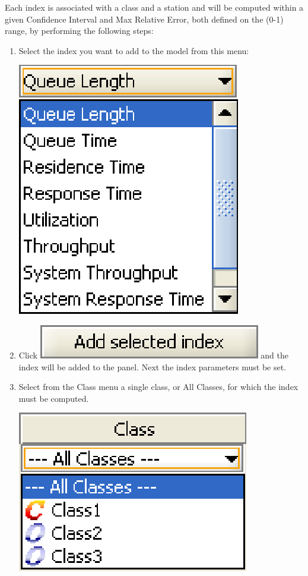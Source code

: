 Each index is associated with a class and a station and will be computed within a given Confidence Interval and Max Relative Error, both defined on the (0-1) range, by performing the following steps:
\begin{enumerate}
\item Select the index you want to add to the model from this menu:
\begin{center}
\includegraphics[scale=.5]{img/jsim/indices1.eps}
\end{center}
\item Click \includegraphics[scale=.5]{img/jsim/add_indice.eps} and the index will be added to the panel. Next the index parameters must be set.
\item Select from the Class menu a single class, or All Classes, for which the index must be computed.
\begin{center}
\includegraphics[scale=.5]{img/jsim/classes.eps}

\end{center}
\end{enumerate}

